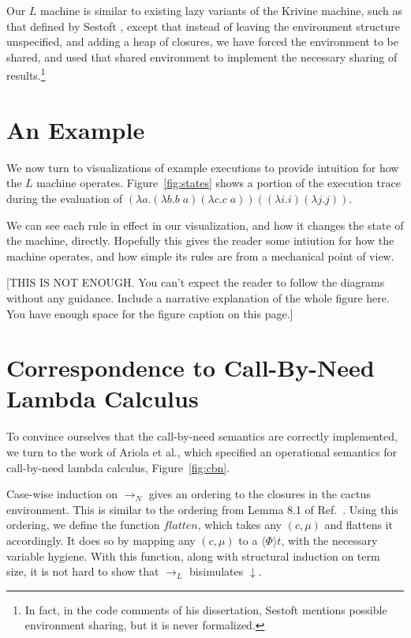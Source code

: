 \documentclass[preprint]{sigplanconf}
\begin{document}
Our $L$ machine is similar to existing lazy variants of the Krivine machine,
such as that defined by Sestoft \cite{sestoft}, except that instead of leaving
the environment structure unspecified, and adding a heap of closures, we have
forced the environment to be shared, and used that shared environment to
implement the necessary sharing of results.\footnote{In fact, in the code
comments of his dissertation, Sestoft mentions possible environment sharing, but
it is never formalized.} 

\section{An Example}

We now turn to visualizations of example executions to provide intuition for how
the $L$ machine operates. Figure~\ref{fig:states} shows a portion of the
execution trace during the evaluation of $(\lambda a.(\lambda b.b \; a) (\lambda
c.c \; a)) ((\lambda i.i) (\lambda j.j))$. 



We can see each rule in effect in our visualization, and how it changes the
state of the machine, directly. Hopefully this gives the reader some intiution
for how the machine operates, and how simple its rules are from a mechanical
point of view. 

[THIS IS NOT ENOUGH. You can't expect the reader to follow the diagrams
without any guidance. Include a narrative explanation of the whole figure here. You have enough
space for the figure caption on this page.]

\section{Correspondence to Call-By-Need Lambda Calculus}
To convince ourselves that the call-by-need
semantics are correctly implemented, we turn to the work of
Ariola et al.\cite{ariola1995call}, which specified an operational semantics for
call-by-need lambda calculus, Figure~\ref{fig:cbn}.



Case-wise induction on $\rightarrow_{N}$ gives an ordering to the closures in
the cactus environment. This is similar to the ordering from Lemma 8.1 of
Ref.~\cite{ariola1995call}.  Using this ordering, we define the function
$flatten$, which takes any $(c, \mu)$ and flattens it accordingly. It does so by
mapping any $(c, \mu)$ to a $\langle \Phi \rangle t$, with the necessary
variable hygiene. With this function, along with structural induction on term
size, it is not hard to show that $\rightarrow_{L}$ bisimulates $\downarrow$.
\end{document}
